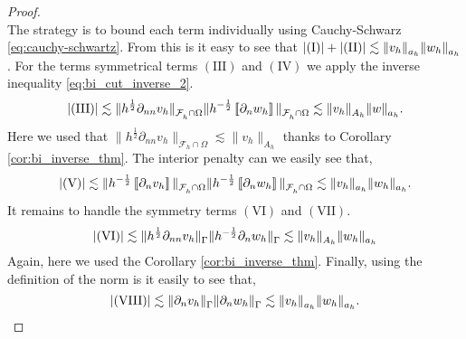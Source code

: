 \begin{proof}
\begin{equation}
                \end{equation}
                The strategy is to bound each term individually using Cauchy-Schwarz \eqref{eq:cauchy-schwartz}. From this is it easy to see that $\left\lvert ( \mathrm{I} )    \right\rvert +  \left\lvert ( \mathrm{II} )    \right\rvert   \lesssim \| v_{h} \|_{a_{h}  }^{  } \| w_{h} \|_{ a_{h}
                }^{  } $. For the terms symmetrical terms $(
                \mathrm{III} ) $ and  $( \mathrm{IV} ) $ we apply the inverse inequality
                \eqref{eq:bi_cut_inverse_2}.
                \begin{equation}
                    \label{eq:invest_1}
                    \left\lvert (\mathrm{III} )   \right\rvert  \lesssim  \|h^{\frac{1}{2}} \partial _{n n} v_{h}  \|_{ \mathcal{F}_{h}^{} \cap \Omega}^{  }\| h^{-\frac{1}{2}} \left[\!\left[  \partial _{n} w_{h}  \right]\!\right]     \|_{\mathcal{F}_{h}^{} \cap \Omega}^{  } \lesssim  \| v_{h} \|_{A_{h}
                    }^{  } \|w    \|_{ a_{h}}^{  }.
                \end{equation}
                Here we used that  $\|h^{\frac{1}{2}} \partial _{n n}  v_{h} \|_{\mathcal{F}_{h}^{} \cap \Omega} \lesssim \| v_{h} \|_{ A_{h}  }^{  }  $ thanks to Corollary \ref{cor:bi_inverse_thm}.
              The interior penalty can we easily see that,
              \begin{equation}
              \left\lvert  ( \mathrm{V} )   \right\rvert  \lesssim  \|h^{-\frac{1}{2}} \left[\!\left[  \partial _{n} v_{h} \right]\!\right]  \|_{ \mathcal{F}_{h}^{} \cap \Omega }^{  }
             \|h^{-\frac{1}{2}} \left[\!\left[  \partial _{n} w_{h} \right]\!\right]  \|_{ \mathcal{F}_{h}^{} \cap \Omega }^{  }  \lesssim  \| v_{h}  \|_{ a_{h} }^{  }
             \| w_{h}  \|_{ a_{h} }^{  }.
              \end{equation}
              It remains to handle the symmetry terms $ ( \mathrm{VI} )$ and $ ( \mathrm{VII} )$.
              \begin{equation}
                    \label{eq:invest_2}
                \left\lvert  ( \mathrm{VI} )   \right\rvert  \lesssim \| h^{\frac{1}{2}}\partial _{nn} v_{h} \|_{\Gamma   }^{  } \| h^{-\frac{1}{2}} \partial _{n}w_{h} \|_{\Gamma   }^{  }  \lesssim \|  v_{h} \|_{A_{h}  }^{  } \| w_{h} \|_{ a_{h}   }^{  }
              \end{equation}
             Again, here we used the Corollary \ref{cor:bi_inverse_thm}.
             Finally, using the definition of the norm is it easily to see that,
             \[
\left\lvert  ( \mathrm{VIII} )   \right\rvert  \lesssim \| \partial _{n}v_{h} \|_{ \Gamma  }^{  }
\| \partial _{n} w_{h} \|_{ \Gamma  }^{  }  \lesssim \| v_{h} \|_{ a_{h} }^{  }
\| w_{h} \|_{ a_{h} }^{  } .
             \]


\end{proof}
